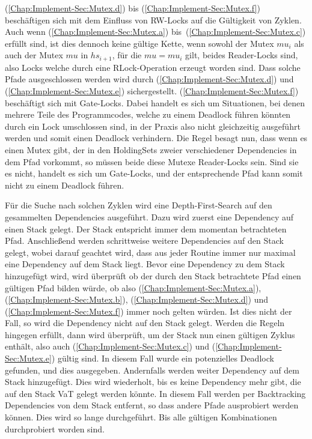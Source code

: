 (\ref{Chap:Implement-Sec:Mutex.d}) bis (\ref{Chap:Implement-Sec:Mutex.f})
beschäftigen sich mit dem Einfluss von RW-Locks auf die Gültigkeit von 
Zyklen. Auch wenn (\ref{Chap:Implement-Sec:Mutex.a}) bis~(\ref{Chap:Implement-Sec:Mutex.c})
erfüllt sind, ist dies dennoch keine gültige Kette, wenn sowohl
der Mutex $mu_i$ als auch der Mutex $mu$ in $hs_{i+1}$, 
für die $mu = mu_i$ gilt, beides Reader-Locks
sind, also Locks welche durch eine RLock-Operation erzeugt worden sind. 
Dass solche Pfade ausgeschlossen werden wird durch (\ref{Chap:Implement-Sec:Mutex.d})
und (\ref{Chap:Implement-Sec:Mutex.e}) sichergestellt.
(\ref{Chap:Implement-Sec:Mutex.f}) beschäftigt sich mit Gate-Locks. 
Dabei handelt es sich um Situationen, bei denen mehrere Teile des Programmcodes,
welche zu einem Deadlock führen könnten durch ein Lock umschlossen sind, 
in der Praxis also nicht gleichzeitig ausgeführt werden und somit einen Deadlock 
verhindern.
Die Regel besagt nun, dass wenn es einen Mutex gibt,
der in den HoldingSets zweier verschiedener Dependencies in dem Pfad vorkommt, so müssen
beide diese Mutexe Reader-Locks sein. Sind sie es nicht, handelt es sich um Gate-Locks, und
der entsprechende Pfad kann somit nicht zu einem Deadlock führen.

Für die Suche nach solchen Zyklen wird eine Depth-First-Search auf den gesammelten 
Dependencies ausgeführt. Dazu wird zuerst eine Dependency auf einen Stack gelegt. 
Der Stack entspricht immer dem momentan
betrachteten Pfad. Anschließend werden schrittweise weitere Dependencies auf den 
Stack gelegt, wobei darauf geachtet wird, dass aus jeder Routine immer nur maximal 
eine Dependency auf dem Stack liegt. Bevor eine Dependency zu dem Stack 
hinzugefügt wird, wird überprüft ob der durch den Stack betrachtete Pfad 
einen gültigen Pfad bilden würde, ob also (\ref{Chap:Implement-Sec:Mutex.a}), 
(\ref{Chap:Implement-Sec:Mutex.b}), (\ref{Chap:Implement-Sec:Mutex.d}) und 
(\ref{Chap:Implement-Sec:Mutex.f}) immer noch gelten würden. Ist dies nicht
der Fall, so wird die Dependency nicht auf den Stack gelegt. Werden die 
Regeln hingegen erfüllt, dann wird überprüft, um der Stack nun einen gültigen
Zyklus enthält, also auch (\ref{Chap:Implement-Sec:Mutex.c}) und (\ref{Chap:Implement-Sec:Mutex.e})
gültig sind. In diesem Fall wurde ein potenzielles Deadlock gefunden, und dies 
ausgegeben. Andernfalls werden weiter Dependency auf dem Stack hinzugefügt. 
Dies wird wiederholt, bis es keine Dependency mehr gibt, die auf den Stack VaT
gelegt werden könnte. In diesem Fall werden per Backtracking Dependencies 
von dem Stack entfernt, so dass andere Pfade ausprobiert werden können.
Dies wird so lange durchgeführt. Bis alle gültigen Kombinationen durchprobiert 
worden sind.


